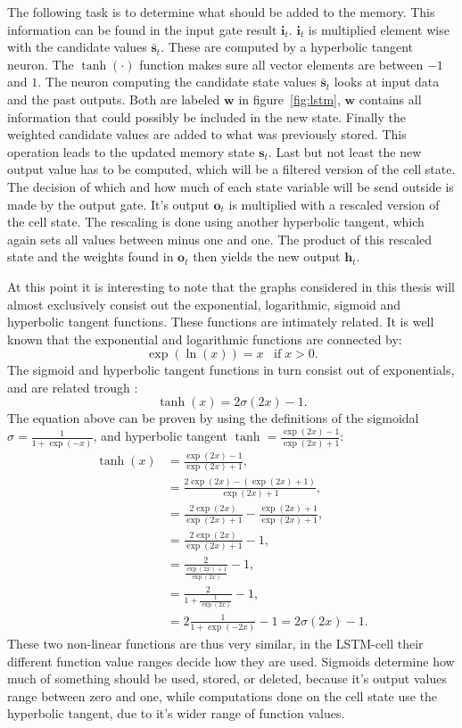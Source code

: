 The following task is to determine what should be added to the memory. This information can be found in the input gate result $\mathbf{i}_t$. $\mathbf{i}_t$ is multiplied element wise with the candidate values $\mathbf{\bar{s}}_t$. These are computed by a hyperbolic tangent neuron.  The $\tanh(\cdot)$ function makes sure all vector elements are between $-1$ and $1$. The neuron computing the candidate state values $\mathbf{\bar{s}}_t$ looks at input data and the past outputs. Both are labeled $\mathbf{w}$ in figure~\ref{fig:lstm}, $\mathbf{w}$ contains all information that could possibly be included in the new state. Finally the weighted candidate values are added to what was previously stored. This operation leads to the updated memory state $\mathbf{s}_t$.
Last but not least the new output value has to be computed, which will be a filtered version of the cell state. The decision of which and how much of each state variable will be send outside is made by the output gate. It's output $\mathbf{o}_t$ is multiplied with a rescaled version of the cell state. The rescaling is done using another hyperbolic tangent, which again sets all values between minus one and one. The product of this rescaled state and the weights found in $\mathbf{o}_t$ then yields the new output $\mathbf{h}_t$.

At this point it is interesting to note that the graphs considered in this thesis will almost exclusively consist
out the exponential, logarithmic, sigmoid and hyperbolic tangent functions. These functions are intimately related. It is well known that the exponential and logarithmic functions are connected by:
\begin{equation}
\exp(\ln(x)) = x \;\;\; \text{if} \; x > 0.
\end{equation}
The sigmoid and hyperbolic tangent functions in turn consist out of exponentials, and are related trough \cite[page 15]{Graves2008}:
\begin{equation}
\tanh(x) = 2\sigma(2x) - 1.
\end{equation}
The equation above can be proven by using the definitions of the sigmoidal $\sigma = \frac{1}{1 + \exp(-x)}$, and hyperbolic tangent $\tanh = \frac{\exp(2x) - 1}{\exp(2x) + 1}$:
\begin{align}
\tanh(x) &= \frac{\exp(2x) - 1}{\exp(2x) + 1}, \\
&= \frac{2\exp(2x) - (\exp(2x) + 1)}{\exp(2x) + 1}, \\
&= \frac{2 \exp(2x)}{\exp(2x) + 1} - \frac{\exp(2x) + 1}{\exp(2x) + 1}, \\
&= \frac{2 \exp(2x)}{\exp(2x) + 1} - 1, \\
&= \frac{2}{\frac{\exp(2x) + 1}{\exp(2x)}} - 1, \\
&= \frac{2}{1 + \frac{1}{\exp(2x)}} - 1, \\
&= 2\frac{1}{1 + \exp(-2x)} - 1 = 2\sigma(2x) - 1.
\end{align}
These two non-linear functions are thus very similar, in the LSTM-cell their different function value ranges decide how they are used. Sigmoids determine how much of something should be used, stored, or deleted, because it's output values range between zero and one, while computations done on the cell state use the hyperbolic tangent, due to it's wider range of function values.


